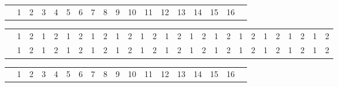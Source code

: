 \documentclass[22pt]{scrartcl}
\begin{document}
\renewcommand\arraystretch{1.25}
\renewcommand\tabcolsep{6pt}

\begin{table}

\begin{tabular}{p{5cm}|c|c|c|c|c|c!{\vrule width 2pt}c|c|c|c|c|c|c|c|c|c!{\vrule width 3pt}p{1cm}!{\vrule width 3pt}}
 & 1 & 2 & 3 & 4 & 5 & 6 & 7 & 8 & 9 & 10 & 11 & 12 & 13 & 14 & 15 & 16 & \\
\end{tabular}

\begin{tabular}{p{5cm}|c|c|c|c|c|c|c|c|c|c|c|c|c|c|c|c|c|c|c|c|c|c|c|c|c|c|}


\cline{2-27}
 & \footnotesize 1 & \footnotesize 2 & \footnotesize 1 & \footnotesize 2 & \footnotesize 1 & \footnotesize 2 & \footnotesize 1 & \footnotesize 2 & \footnotesize 1 & \footnotesize 2 & \footnotesize 1 & \footnotesize 2 & \footnotesize 1 & \footnotesize 2 & \footnotesize 1 & \footnotesize 2 & \footnotesize 1 & \footnotesize 2 & \footnotesize 1 & \footnotesize 2 & \footnotesize 1 & \footnotesize 2 & \footnotesize 1 & \footnotesize 2 & \footnotesize 1 & \footnotesize 2 \\
\cline{1-27} 

\cline{1-27}
 & \footnotesize 1 & \footnotesize 2 & \footnotesize 1 & \footnotesize 2 & \footnotesize 1 & \footnotesize 2 & \footnotesize 1 & \footnotesize 2 & \footnotesize 1 & \footnotesize 2 & \footnotesize 1 & \footnotesize 2 & \footnotesize 1 & \footnotesize 2 & \footnotesize 1 & \footnotesize 2 & \footnotesize 1 & \footnotesize 2 & \footnotesize 1 & \footnotesize 2 & \footnotesize 1 & \footnotesize 2 & \footnotesize 1 & \footnotesize 2 & \footnotesize 1 & \footnotesize 2 \\
\cline{2-27}

\end{tabular}

\begin{tabular}{p{5cm}|c|c|c|c|c|c!{\vrule width 2pt}c|c|c|c|c|c|c|c|c|c!{\vrule width 3pt}p{1cm}!{\vrule width 3pt}}

& 1 & 2 & 3 & 4 & 5 & 6 & 7 & 8 & 9 & 10 & 11 & 12 & 13 & 14 & 15 & 16 & \\
\end{tabular}

~\\


\end{table}
\end{document}
